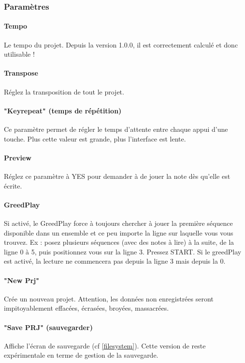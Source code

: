 \documentclass[12pt,a4paper]{article}
\begin{document}
        \subsubsection{Paramètres}

        \paragraph{Tempo} Le tempo du projet. Depuis la version 1.0.0, il est correctement calculé et donc utilisable !

        \paragraph{Transpose} Réglez la transposition de tout le projet.

        \paragraph{"Keyrepeat" (temps de répétition)} Ce paramètre permet de régler le temps d'attente entre chaque appui d'une touche. Plus cette valeur est grande, plus l'interface est lente.

        \paragraph{Preview} Réglez ce paramètre à YES pour demander à \FAT de jouer la note dès qu'elle est écrite.

        \paragraph{GreedPlay} Si activé, le GreedPlay force \FAT à toujours chercher à jouer la première séquence disponible dans un ensemble et ce peu importe la ligne sur laquelle vous vous trouvez. Ex : posez plusieurs séquences (avec des notes à lire) à la suite, de la ligne 0 à 5, puis positionnez vous sur la ligne 3. Pressez START. Si le greedPlay est activé, la lecture ne commencera pas depuis la ligne 3 mais depuis la 0.

        \paragraph{"New Prj"} Crée un nouveau projet. Attention, les données non enregistrées seront impitoyablement effacées, écrasées, broyées, massacrées.

        \paragraph{"Save PRJ" (sauvegarder)}  Affiche l'écran de sauvegarde (cf \ref{filesystem}). Cette version de \FAT reste expérimentale en terme de gestion de la sauvegarde.
\end{document}
